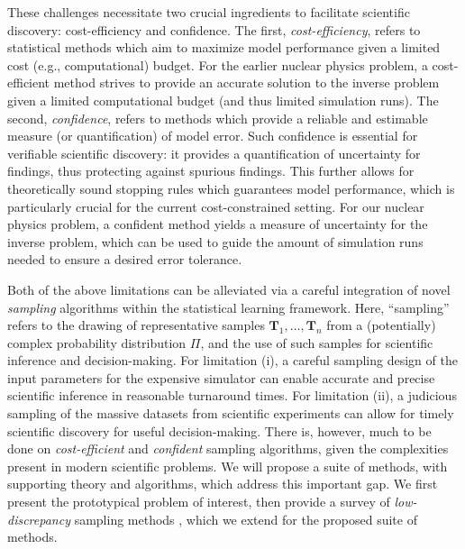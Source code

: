 \documentclass[11pt]{NSFamsart}
\newcommand{\cmtS}[1]{{\color{blue}{(Simon: #1)}}}
\newcommand{\bT}{{\boldsymbol{T}}}
\begin{document}
These challenges necessitate two crucial ingredients to facilitate scientific discovery: cost-efficiency and confidence. The first, \textit{cost-efficiency}, refers to statistical methods which aim to maximize model performance given a limited cost (e.g., computational) budget. For the earlier nuclear physics problem, a cost-efficient method strives to provide an accurate solution to the inverse problem given a limited computational budget (and thus limited simulation runs). The second, \textit{confidence}, refers to methods which provide a reliable and estimable measure (or quantification) of model error. Such confidence is essential for verifiable scientific discovery: it provides a quantification of uncertainty for findings, thus protecting against spurious findings. This further allows for theoretically sound stopping rules which guarantees model performance, which is particularly crucial for the current cost-constrained setting. For our nuclear physics problem, a confident method yields a measure of uncertainty for the inverse problem, which can be used to guide the amount of simulation runs needed to ensure a desired error tolerance.

Both of the above limitations can be alleviated via a careful integration of novel \textit{sampling} algorithms within the statistical learning framework. Here, ``sampling'' refers to the drawing of representative samples $\bT_1, \dots, \bT_n$ from a (potentially) complex probability distribution $\Pi$, and the use of such samples for scientific inference and decision-making. For limitation (i), a careful sampling design of the input parameters for the expensive simulator can enable accurate and precise scientific inference in reasonable turnaround times. For limitation (ii), a judicious sampling of the massive datasets from scientific experiments can allow for timely scientific discovery for useful decision-making. There is, however, much to be done on \textit{cost-efficient} and \textit{confident} sampling algorithms, given the complexities present in modern scientific problems. We will propose a suite of methods, with supporting theory and algorithms, which address this important gap. We first present the prototypical problem of interest, then provide a survey of \textit{low-discrepancy} sampling methods \citep{niederreiter1992random}, which we extend for the proposed suite of methods.


\end{document}
